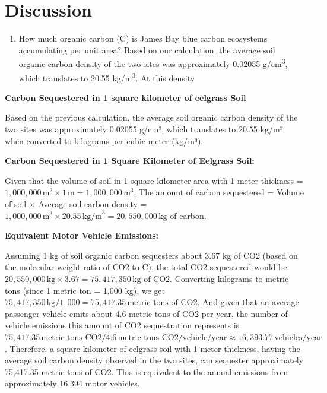 \documentclass[
  12pt,
]{article}
\providecommand{\tightlist}{%
  \setlength{\itemsep}{0pt}\setlength{\parskip}{0pt}}
\begin{document}
\newpage

\hypertarget{discussion}{%
\section{Discussion}\label{discussion}}

\begin{enumerate}
\def\labelenumi{\arabic{enumi}.}
\tightlist
\item
  How much organic carbon (C) is James Bay blue carbon ecosystems
  accumulating per unit area? Based on our calculation, the average soil
  organic carbon density of the two sites was approximately 0.02055
  g/cm\textsuperscript{3}, which translates to 20.55
  kg/m\textsuperscript{3}. At this density
\end{enumerate}

\textbf{Carbon Sequestered in 1 square kilometer of eelgrass Soil}

Based on the previous calculation, the average soil organic carbon
density of the two sites was approximately 0.02055 g/cm³, which
translates to 20.55 kg/m³ when converted to kilograms per cubic meter
(kg/m³).

\textbf{Carbon Sequestered in 1 Square Kilometer of Eelgrass Soil:}

Given that the volume of soil in 1 square kilometer area with 1 meter
thickness =
\(1,000,000 \, \text{m}^2 \times 1 \, \text{m} = 1,000,000 \, \text{m}^3\).
The amount of carbon sequestered = Volume of soil \(\times\) Average
soil carbon density =
\(1,000,000 \, \text{m}^3 \times 20.55 \, \text{kg/m}^3 = 20,550,000 \, \text{kg}\)
of carbon.

\textbf{Equivalent Motor Vehicle Emissions:}

Assuming 1 kg of soil organic carbon sequesters about 3.67 kg of CO2
(based on the molecular weight ratio of CO2 to C), the total CO2
sequestered would be
\(20,550,000 \, \text{kg} \times 3.67 = 75,417,350 \, \text{kg of CO2}\).
Converting kilograms to metric tons (since 1 metric ton = 1,000 kg), we
get
\(75,417,350 \, \text{kg} / 1,000 = 75,417.35 \, \text{metric tons of CO2}\).
And given that an average passenger vehicle emits about 4.6 metric tons
of CO2 per year, the number of vehicle emissions this amount of CO2
sequestration represents is
\(75,417.35 \, \text{metric tons CO2} / 4.6 \, \text{metric tons CO2/vehicle/year} \approx 16,393.77 \, \text{vehicles/year}\).
Therefore, a square kilometer of eelgrass soil with 1 meter thickness,
having the average soil carbon density observed in the two sites, can
sequester approximately 75,417.35 metric tons of CO2. This is equivalent
to the annual emissions from approximately 16,394 motor vehicles.
\end{document}
